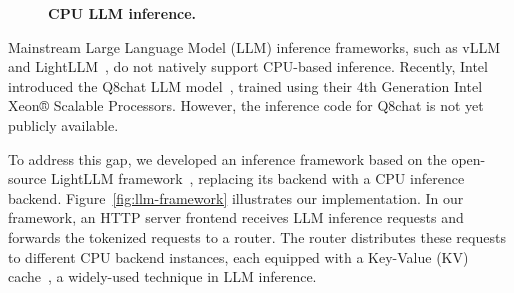 \begin{figure}[h!]
\centering
{}
\caption[CPU LLM inference]{\textbf{CPU LLM inference.} }
\end{figure}
Mainstream Large Language Model (LLM) inference frameworks, such as vLLM~\cite{vllm} and LightLLM~\cite{lightllm}, do not natively support CPU-based inference. Recently, Intel introduced the Q8chat LLM model~\cite{q8chat}, trained using their 4th Generation Intel Xeon® Scalable Processors. However, the inference code for Q8chat is not yet publicly available. 

To address this gap, we developed an inference framework based on the open-source LightLLM framework~\cite{lightllm}, replacing its backend with a CPU inference backend. Figure~\ref{fig:llm-framework} illustrates our implementation. In our framework, an HTTP server frontend receives LLM inference requests and forwards the tokenized requests to a router. The router distributes these requests to different CPU backend instances, each equipped with a Key-Value (KV) cache~\cite{kvcache}, a widely-used technique in LLM inference.

